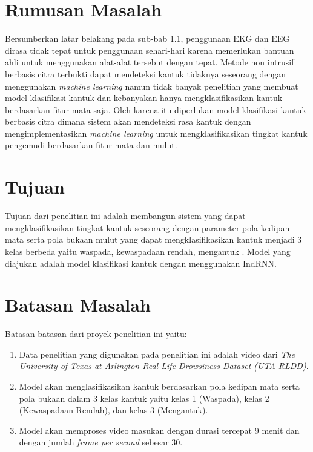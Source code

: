 \section{Rumusan Masalah}
\label{sec:permasalahan}

Bersumberkan latar belakang pada sub-bab 1.1, penggunaan EKG dan
EEG dirasa tidak tepat untuk penggunaan sehari-hari karena memerlukan
bantuan ahli untuk menggunakan alat-alat tersebut dengan tepat. Metode non
intrusif berbasis citra terbukti dapat mendeteksi kantuk tidaknya seseorang
dengan menggunakan \emph{machine learning} namun tidak banyak penelitian yang
membuat model klasifikasi kantuk dan kebanyakan hanya mengklasifikasikan kantuk
berdasarkan fitur mata saja. Oleh karena itu diperlukan model klasifikasi kantuk
berbasis citra dimana sistem akan mendeteksi rasa kantuk dengan mengimplementasikan
\emph{machine learning} untuk mengklasifikasikan tingkat kantuk pengemudi berdasarkan
fitur mata dan mulut.

\section{Tujuan}
\label{sec:Tujuan}

Tujuan dari penelitian ini adalah membangun sistem yang dapat mengklasifikasikan
tingkat kantuk  seseorang dengan parameter pola kedipan mata serta pola bukaan mulut
yang dapat mengklasifikasikan kantuk menjadi 3 kelas berbeda yaitu waspada,
kewaspadaan rendah, mengantuk \parencite{14}. Model yang diajukan adalah model klasifikasi kantuk
dengan menggunakan IndRNN.

\section{Batasan Masalah}
\label{sec:batasanmasalah}
Batasan-batasan dari proyek penelitian ini yaitu:
\begin{enumerate}[nolistsep]

      \item Data penelitian yang digunakan pada penelitian ini adalah video
            dari \emph{The University of Texas at Arlington Real-Life Drowsiness Dataset (UTA-RLDD)}.

      \item Model akan menglasifikasikan kantuk berdasarkan pola kedipan
            mata serta pola bukaan  dalam 3 kelas kantuk
            yaitu kelas 1 (Waspada), kelas 2 (Kewaspadaan Rendah),
            dan kelas 3 (Mengantuk)\parencite{14}.

      \item Model akan memproses video masukan dengan durasi
            tercepat 9 menit dan dengan jumlah \emph{frame per second}
            sebesar 30.
\end{enumerate}

